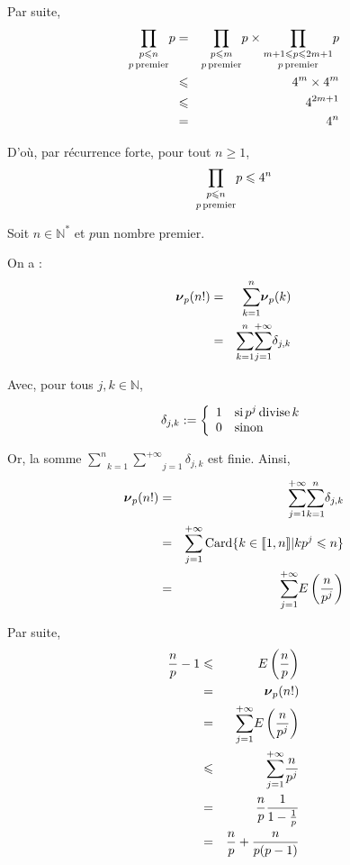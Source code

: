Par suite,
\begin{eqnarray*}
  \underset{p \operatorname{premier}}{\underset{p \leqslant n}{\prod}} p & = &
  \underset{p \operatorname{premier}}{\underset{p \leqslant m}{\prod}} p \times
  \underset{p \operatorname{premier}}{\underset{m + 1 \leqslant p \leqslant 2 m +
  1}{\prod}} p\\
  & \leqslant & 4^m \times 4^m\\
  & \leqslant & 4^{2 m + 1}\\
  & = & 4^n
\end{eqnarray*}


D'o{\`u}, par r{\'e}currence forte, pour tout $n \geqslant 1$,
\[ \underset{p \operatorname{premier}}{\underset{p \leqslant n}{\prod}} p \leqslant
   4^n \]


 Soit $n \in \mathbb{N}^{\ast}$ et $p$un nombre premier.

On a :
\begin{eqnarray*}
  \boldsymbol{\nu}_p (n!) & = & \underset{k = 1}{\overset{n}{\sum}}
  \boldsymbol{\nu}_p (k)\\
  & = & \underset{k = 1}{\overset{n}{\sum}} \underset{j = 1}{\overset{+
  \infty}{\sum}} \delta_{j, k}
\end{eqnarray*}


Avec, pour tous $j, k \in \mathbb{N}$,


\[ \delta_{j, k} := \left\{\begin{array}{ll}
     1 & \operatorname{si} p^j \operatorname{divise} k\\
     0 & \operatorname{sinon}
   \end{array}\right. \]


Or, la somme $\underset{k = 1}{\overset{n}{\sum}} \underset{j = 1}{\overset{+
\infty}{\sum}} \delta_{j, k}$ est finie. Ainsi,
\begin{eqnarray*}
  \boldsymbol{\nu}_p (n!) & = & \underset{j = 1}{\overset{+ \infty}{\sum}}
  \underset{k = 1}{\overset{n}{\sum}} \delta_{j, k}\\
  & = & \underset{j = 1}{\overset{+ \infty}{\sum}} \operatorname{Card} \{ k \in
  \llbracket 1, n \rrbracket  |  k p^j \leqslant n \}\\
  & = & \underset{j = 1}{\overset{+ \infty}{\sum}} E \left( \frac{n}{p^j}
  \right)
\end{eqnarray*}


Par suite,
\begin{eqnarray*}
  \frac{n}{p} - 1 & \leqslant & E \left( \frac{n}{p} \right)\\
  & = & \boldsymbol{\nu}_p (n!)\\
  & = & \underset{j = 1}{\overset{+ \infty}{\sum}} E \left( \frac{n}{p^j}
  \right)\\
  & \leqslant & \underset{j = 1}{\overset{+ \infty}{\sum}} \frac{n}{p^j}\\
  & = & \frac{n}{p} \frac{1}{1 - \frac{1}{p}}\\
  & = & \frac{n}{p} + \frac{n}{p (p - 1)}
\end{eqnarray*}


